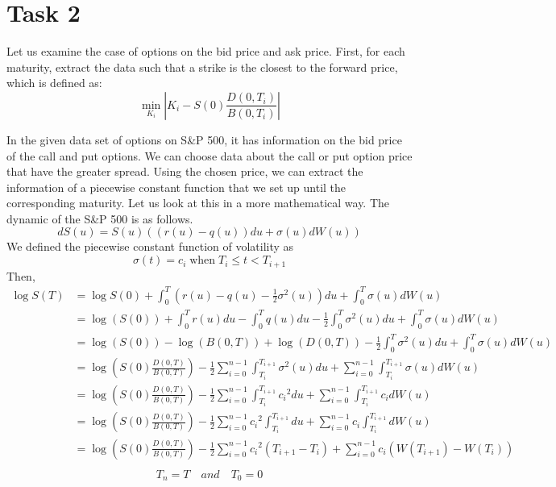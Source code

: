 \section*{Task 2}

Let us examine the case of options on the bid price and ask price.
First, for each maturity, extract the data such that a strike is the closest to the forward price, which is defined as:
\[\min_{K_i}\left|K_i - S(0)\frac{D(0,T_i)}{B(0,T_i)}\right|  \]

In the given data set of options on S\&P 500, it has information on the bid price of the call and put options. We can choose data about the call or put option price that have the greater spread. Using the chosen price, we can extract the information of a piecewise constant function that we set up until the corresponding maturity. 
\vspace{1ex}
Let us look at this in a more mathematical way.
The dynamic of the S\&P 500 is as follows.
\[dS(u)=S(u)((r(u)-q(u))du+\sigma(u)dW(u))\]
We defined the piecewise constant function of volatility as
\[\sigma(t)=c_i \;\text{when}\;T_i\leq t<T_{i+1} \]
Then,
\begin{align*}
\log S(T) &= \log S(0) + \int_0^T \left(r(u)-q(u)-\frac{1}{2}\sigma^2(u)\right)du+     \int_0^T \sigma(u)dW(u)\\
&= \log \left( S(0)\right)+\int_0^Tr(u)du-\int_0^Tq(u)du -\frac{1}{2}\int_0^T\sigma^2(u)du +\int_0^T \sigma(u)dW(u)\\
&= \log \left( S(0)\right)-\log \left( B(0,T)\right) +\log \left( D(0,T)\right) -\frac{1}{2}\int_0^T\sigma^2(u)du +\int_0^T \sigma(u)dW(u)\\
&= \log \left( S(0)\frac{D(0,T)}{B(0,T)}\right)-\frac{1}{2}\sum_{i=0}^{n-1}\int_{T_i}^{T_{i+1}} \sigma^2(u)du+\sum_{i=0}^{n-1}\int_{T_i}^{T_{i+1}} \sigma(u)dW(u)\\
&= \log \left( S(0)\frac{D(0,T)}{B(0,T)}\right)-\frac{1}{2}\sum_{i=0}^{n-1}\int_{T_i}^{T_{i+1}} {c_i}^2du+\sum_{i=0}^{n-1}\int_{T_i}^{T_{i+1}} {c_i}dW(u)\\
&= \log \left( S(0)\frac{D(0,T)}{B(0,T)}\right)-\frac{1}{2}\sum_{i=0}^{n-1} {c_i}^2\int_{T_i}^{T_{i+1}}du+\sum_{i=0}^{n-1}{c_i}\int_{T_i}^{T_{i+1}} dW(u)\\
&= \log \left( S(0)\frac{D(0,T)}{B(0,T)}\right)-\frac{1}{2}\sum_{i=0}^{n-1} {c_i}^2(T_{i+1}-T_{i})+\sum_{i=0}^{n-1} c_i (W(T_{i+1})-W(T_{i}))\\
\end{align*}
\begin{align*}
    T_{n}=T \quad and \quad T_0=0
\end{align*}

